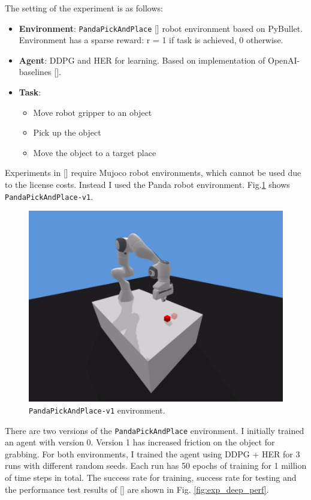\documentclass[conference]{IEEEtran}
\begin{document}
The setting of the experiment is as follows:
\begin{itemize}
\item \textbf{Environment}: \texttt{PandaPickAndPlace} [\cite{gallouedec2021multi}] robot environment based on PyBullet. Environment has a sparse reward: r = 1 if task is achieved, 0 otherwise.
\item \textbf{Agent}: DDPG and HER for learning. Based on implementation of OpenAI-baselines [\cite{baselines}].
\item \textbf{Task}:
    \begin{itemize}
        \item Move robot gripper to an object
        \item Pick up the object
        \item Move the object to a target place
    \end{itemize}
\end{itemize}

Experiments in [\cite{plappert2018multi}] require Mujoco robot environments, which cannot be used due to the license costs. Instead I used the Panda robot environment. Fig.\ref{fig:PandaPickAndPlace} shows \texttt{PandaPickAndPlace-v1}.
\begin{figure}[ht]
\centering
\includegraphics[width=0.6\columnwidth]{img/PandaPickAndPlace-v1.png}
\caption{\texttt{PandaPickAndPlace-v1} environment.}
\label{fig:PandaPickAndPlace}
\end{figure}

There are two versions of the \texttt{PandaPickAndPlace} environment. I initially trained an agent with version 0. Version 1 has increased friction on the object for grabbing. For both environments, I trained the agent using DDPG + HER for 3 runs with different random seeds. Each run has 50 epochs of training for 1 million of time steps in total. The success rate for training, success rate for testing and the performance test results of [\cite{plappert2018multi}] are shown in Fig. \ref{fig:exp_deep_perf}.
\end{document}

